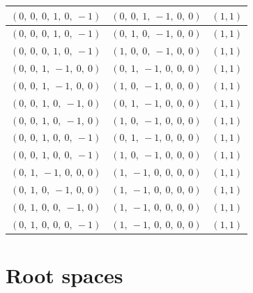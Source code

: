\documentclass[11pt]{article}
\theoremstyle{definition}
\begin{document}
\begin{center}
\begin{tabular}{|l|l|c|}
    \hline
    $\left( 0, \  0, \  0, \  1, \  0, \  -1\right)$ & $\left( 0, \  0, \  1, \  -1, \  0, \  0\right)$ & $(1,1)$ \\
    \hline
    $\left( 0, \  0, \  0, \  1, \  0, \  -1\right)$ & $\left( 0, \  1, \  0, \  -1, \  0, \  0\right)$ & $(1,1)$ \\
    \hline
    $\left( 0, \  0, \  0, \  1, \  0, \  -1\right)$ & $\left( 1, \  0, \  0, \  -1, \  0, \  0\right)$ & $(1,1)$ \\
    \hline
    $\left( 0, \  0, \  1, \  -1, \  0, \  0\right)$ & $\left( 0, \  1, \  -1, \  0, \  0, \  0\right)$ & $(1,1)$ \\
    \hline
    $\left( 0, \  0, \  1, \  -1, \  0, \  0\right)$ & $\left( 1, \  0, \  -1, \  0, \  0, \  0\right)$ & $(1,1)$ \\
    \hline
    $\left( 0, \  0, \  1, \  0, \  -1, \  0\right)$ & $\left( 0, \  1, \  -1, \  0, \  0, \  0\right)$ & $(1,1)$ \\
    \hline
    $\left( 0, \  0, \  1, \  0, \  -1, \  0\right)$ & $\left( 1, \  0, \  -1, \  0, \  0, \  0\right)$ & $(1,1)$ \\
    \hline
    $\left( 0, \  0, \  1, \  0, \  0, \  -1\right)$ & $\left( 0, \  1, \  -1, \  0, \  0, \  0\right)$ & $(1,1)$ \\
    \hline
    $\left( 0, \  0, \  1, \  0, \  0, \  -1\right)$ & $\left( 1, \  0, \  -1, \  0, \  0, \  0\right)$ & $(1,1)$ \\
    \hline
    $\left( 0, \  1, \  -1, \  0, \  0, \  0\right)$ & $\left( 1, \  -1, \  0, \  0, \  0, \  0\right)$ & $(1,1)$ \\
    \hline
    $\left( 0, \  1, \  0, \  -1, \  0, \  0\right)$ & $\left( 1, \  -1, \  0, \  0, \  0, \  0\right)$ & $(1,1)$ \\
    \hline
    $\left( 0, \  1, \  0, \  0, \  -1, \  0\right)$ & $\left( 1, \  -1, \  0, \  0, \  0, \  0\right)$ & $(1,1)$ \\
    \hline
    $\left( 0, \  1, \  0, \  0, \  0, \  -1\right)$ & $\left( 1, \  -1, \  0, \  0, \  0, \  0\right)$ & $(1,1)$ \\
    \hline
\end{tabular}
\end{center}


\section{Root spaces}
\end{document}
